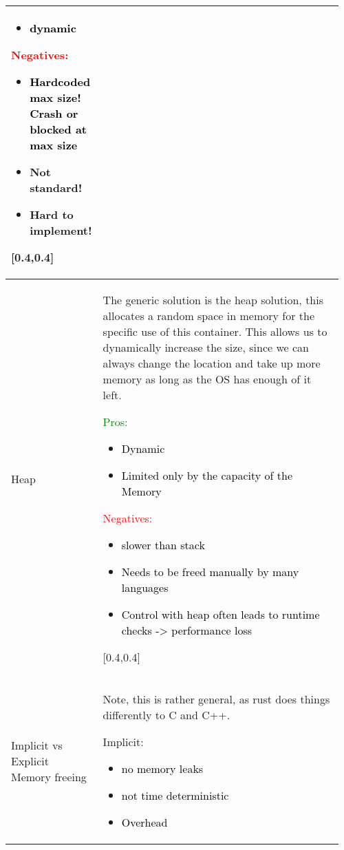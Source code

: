 \documentclass[main.tex,fontsize=8pt,paper=a4,paper=portrait,DIV=calc,]{scrartcl}
\begin{document}
\begin{table}[ht!]
\begin{tabular}{|m{0.2\linewidth}|m{0.755\linewidth}|}
{\begin{itemize}
\item \textcolor{black}{dynamic}
\end{itemize} 
}{ 
\textcolor{red}{Negatives:}\newline
\begin{itemize}
  \item \textcolor{black}{Hardcoded \textbf{max} size! Crash or blocked at max size}
  \item \textbf{Not standard!}
  \item Hard to implement!
\end{itemize} 
}[0.4,0.4]\\
\hline
Heap & 
The generic solution is the heap solution, this allocates a random space in memory for the specific use of this container.\newline
This allows us to dynamically increase the size, since we can always change the location and take up more memory as long as the OS has enough of it left.\newline
\minipg{
\textcolor{green}{Pros:}\newline
\begin{itemize}
\item \textcolor{black}{Dynamic}
\item \textcolor{black}{Limited only by the capacity of the Memory}
\end{itemize} 
}{ 
\textcolor{red}{Negatives:}\newline
\begin{itemize}
\item \textcolor{black}{slower than stack}
\item \textcolor{black}{Needs to be freed manually by many languages}
\item \textcolor{black}{Control with heap often leads to runtime checks \newline -> performance loss}
\end{itemize} 
}[0.4,0.4]\\
\hline
Implicit vs Explicit Memory freeing & 
Note, this is rather general, as rust does things differently to C and C++.\newline
\minipg{
Implicit:\newline
\begin{itemize}
\item \textcolor{black}{no memory leaks}
\item \textcolor{black}{not time deterministic}
\item \textcolor{black}{Overhead}
\end{itemize} 
}
\end{tabular}
\end{table}
\end{document}
